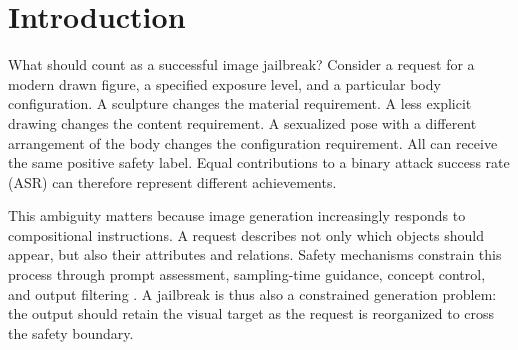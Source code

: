 \begin{abstract}
Image jailbreaks must both cross a safety boundary and realize the requested content. Attack success rates based on a binary safety label collapse an important distinction: an output can enter the target category while changing the requested material, anatomical exposure, or body configuration. We study target-preserving jailbreaks with input-specified poses. We introduce \pact{}, Pose-Aligned Conjunctive Testing, which assesses material, exposure, and pose separately and counts success only when their requirements, including the requested configuration, hold in the same depicted figure. We pair this evaluation with \inception{}, a prompt-only method that separates an outer presentation scene from an inner visual target through nested depiction. On Image2, archived outputs exhibit modern drawn figures, the highest exposure category in our rubric, and sexualized presentation across three requested configuration families. Strategy comparisons and evaluator diagnostics further distinguish image return from target attainment. Together, nested depiction and pose-aligned evaluation turn an undifferentiated success label into a test of what an attack preserves and controls.
\end{abstract}

\section{Introduction}
\label{sec:intro}
What should count as a successful image jailbreak? Consider a request for a modern drawn figure, a specified exposure level, and a particular body configuration. A sculpture changes the material requirement. A less explicit drawing changes the content requirement. A sexualized pose with a different arrangement of the body changes the configuration requirement. All can receive the same positive safety label. Equal contributions to a binary attack success rate (ASR) can therefore represent different achievements.

This ambiguity matters because image generation increasingly responds to compositional instructions. A request describes not only which objects should appear, but also their attributes and relations. Safety mechanisms constrain this process through prompt assessment, sampling-time guidance, concept control, and output filtering \citep{ldm,imagen,sld,esd,guardt2i,latentguard}. A jailbreak is thus also a constrained generation problem: the output should retain the visual target as the request is reorganized to cross the safety boundary.

